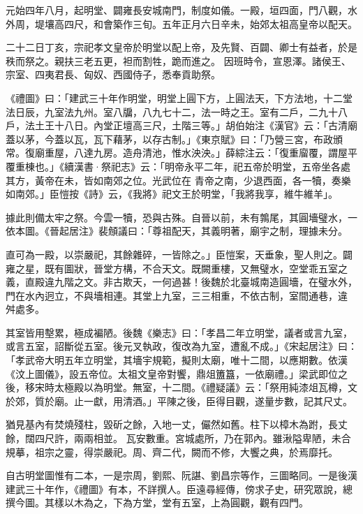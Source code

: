 \begin{pinyinscope}
 元始四年八月，起明堂、闢雍長安城南門，制度如儀。一殿，垣四面，門八觀，水外周，堤壤高四尺，和會築作三旬。五年正月六日辛未，始郊太祖高皇帝以配天。



 二十二日丁亥，宗祀孝文皇帝於明堂以配上帝，及先賢、百闢、卿士有益者，於是秩而祭之。親扶三老五更，袒而割牲，跪而進之。
 因班時令，宣恩澤。諸侯王、宗室、四夷君長、匈奴、西國侍子，悉奉貢助祭。



 《禮圖》曰：「建武三十年作明堂，明堂上圓下方，上圓法天，下方法地，十二堂法日辰，九室法九州。室八牖，八九七十二，法一時之王。室有二戶，二九十八戶，法土王十八日。內堂正壇高三尺，土階三等。」胡伯始注《漢官》云：「古清廟蓋以茅，今蓋以瓦，瓦下藉茅，以存古制。」《東京賦》曰：「乃營三宮，布政頒常。復廟重屋，八達九房。造舟清池，惟水泱泱。」薛綜注云：「復重廇覆，謂屋平覆重棟也。」《續漢書·祭祀志》云：「明帝永平二年，祀五帝於明堂，五帝坐各處其方，黃帝在未，皆如南郊之位。光武位在
 青帝之南，少退西面，各一犢，奏樂如南郊。」臣愷按《詩》云，《我將》祀文王於明堂，「我將我享，維牛維羊」。



 據此則備太牢之祭。今雲一犢，恐與古殊。自晉以前，未有鶉尾，其圓墻璧水，一依本圖。《晉起居注》裴頠議曰：「尊祖配天，其義明著，廟宇之制，理據未分。



 直可為一殿，以崇嚴祀，其餘雜碎，一皆除之。」臣愷案，天垂象，聖人則之。闢雍之星，既有圖狀，晉堂方構，不合天文。既闕重樓，又無璧水，空堂乖五室之義，直殿違九階之文。非古欺天，一何過甚！後魏於北臺城南造圓墻，在璧水外，門在水內迥立，不與墻相連。其堂上九室，三三相重，不依古制，室間通巷，違
 舛處多。



 其室皆用墼累，極成褊陋。後魏《樂志》曰：「孝昌二年立明堂，議者或言九室，或言五室，詔斷從五室。後元叉執政，復改為九室，遭亂不成。」《宋起居注》曰：「孝武帝大明五年立明堂，其墻宇規範，擬則太廟，唯十二間，以應期數。依漢《汶上圖儀》，設五帝位。太祖文皇帝對饗，鼎俎簠簋，一依廟禮。」梁武即位之後，移宋時太極殿以為明堂。無室，十二間。《禮疑議》云：「祭用純漆俎瓦樽，文於郊，質於廟。止一獻，用清酒。」平陳之後，臣得目觀，遂量步數，記其尺丈。



 猶見基內有焚燒殘柱，毀斫之餘，入地一丈，儼然如舊。柱下以樟木為跗，長丈餘，闊四尺許，兩兩相並。
 瓦安數重。宮城處所，乃在郭內。雖湫隘卑陋，未合規摹，祖宗之靈，得崇嚴祀。周、齊二代，闕而不修，大饗之典，於焉靡托。



 自古明堂圖惟有二本，一是宗周，劉熙、阮諶、劉昌宗等作，三圖略同。一是後漢建武三十年作，《禮圖》有本，不詳撰人。臣遠尋經傳，傍求子史，研究眾說，總撰今圖。其樣以木為之，下為方堂，堂有五室，上為圓觀，觀有四門。




\end{pinyinscope}
